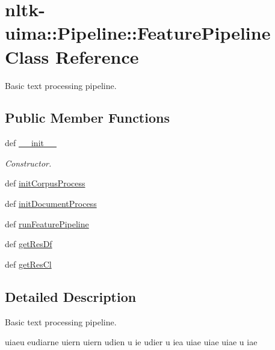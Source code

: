 \hypertarget{classnltk-uima_1_1Pipeline_1_1FeaturePipeline}{\section{nltk-\/uima\-:\-:\-Pipeline\-:\-:\-Feature\-Pipeline \-Class \-Reference}
\label{classnltk-uima_1_1Pipeline_1_1FeaturePipeline}
}


\-Basic text processing pipeline.  


\subsection*{\-Public \-Member \-Functions}
\begin{DoxyCompactItemize}
\item 
def \hyperlink{classnltk-uima_1_1Pipeline_1_1FeaturePipeline_aa76db0a459461c5a8e2feaec6914d1be}{\-\_\-\-\_\-init\-\_\-\-\_\-}
\begin{DoxyCompactList}\small\item\em \-Constructor. \end{DoxyCompactList}\item 
def \hyperlink{classnltk-uima_1_1Pipeline_1_1FeaturePipeline_aae3be58937ccaf554d3132e1bc4794ff}{init\-Corpus\-Process}
\item 
def \hyperlink{classnltk-uima_1_1Pipeline_1_1FeaturePipeline_a382e4e64f510717e6f45a87cfdb18a95}{init\-Document\-Process}
\item 
def \hyperlink{classnltk-uima_1_1Pipeline_1_1FeaturePipeline_aa424b6ac588d035d5350915c8664b2b8}{run\-Feature\-Pipeline}
\item 
def \hyperlink{classnltk-uima_1_1Pipeline_1_1FeaturePipeline_a717cac31fb95af2594a4ba38d3556d59}{get\-Res\-Df}
\item 
def \hyperlink{classnltk-uima_1_1Pipeline_1_1FeaturePipeline_afcf3f98bbf18156fad8e5b3099f1adef}{get\-Res\-Cl}
\end{DoxyCompactItemize}


\subsection{\-Detailed \-Description}
\-Basic text processing pipeline. 

uiaeu eudiarne uiern uiern udien u ie udier u iea uiae uiae uiae u iae 

